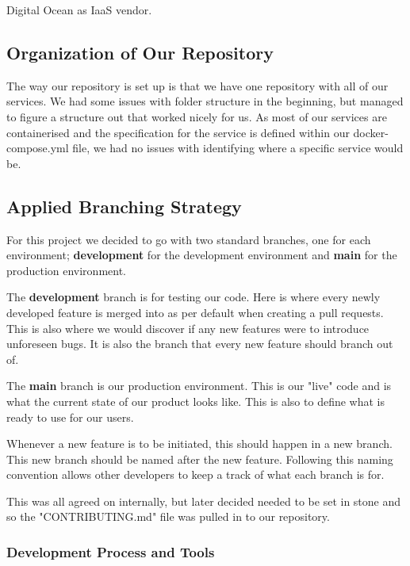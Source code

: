 Digital Ocean as IaaS vendor.


\subsection{Organization of Our Repository}
The way our repository is set up is that we have one repository with all of our services. We had some issues with folder structure in the beginning, but managed to figure a structure out that worked nicely for us. As most of our services are containerised and the specification for the service is defined within our docker-compose.yml file, we had no issues with identifying where a specific service would be.


\subsection{Applied Branching Strategy}
For this project we decided to go with two standard branches, one for each environment; \textbf{development} for the development environment and \textbf{main} for the production environment.

The \textbf{development} branch is for testing our code. Here is where every newly developed feature is merged into as per default when creating a pull requests. This is also where we would discover if any new features were to introduce unforeseen bugs. It is also the branch that every new feature should branch out of.

The \textbf{main} branch is our production environment. This is our "live" code and is what the current state of our product looks like. This is also to define what is ready to use for our users.

Whenever a new feature is to be initiated, this should happen in a new branch. This new branch should be named after the new feature. Following this naming convention allows other developers to keep a track of what each branch is for.

This was all agreed on internally, but later decided needed to be set in stone and so the "CONTRIBUTING.md" file was pulled in to our repository.


\subsubsection{Development Process and Tools}

